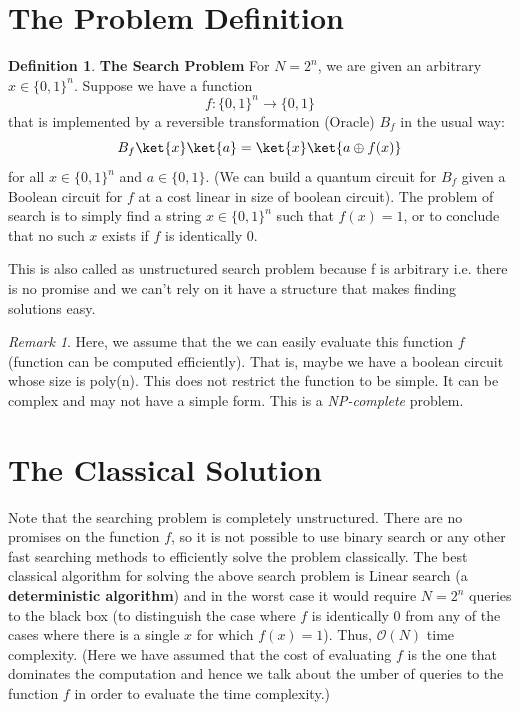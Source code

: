 \documentclass[12pt, oneside]{book}
\theoremstyle{definition}
\newtheorem{definition}{Definition}[section]
\theoremstyle{definition}
\theoremstyle{remark}
\newtheorem*{remark}{Remark}
\begin{document}
\section{The Problem Definition}
\begin{definition}
    \textbf{The Search Problem} For $N = 2^n$, we are given an arbitrary $x \in \{0, 1\}^n$.
    Suppose we have a function
    \[
        f:\{0,1\}^n \rightarrow \{0,1\}
    \]
    that is implemented by a reversible transformation (Oracle) $B_f$ in the usual way:
    \[
        B_f\ket{x}\ket{a}=\ket{x}\ket{a\oplus f(x)}
    \]
    for all $x \in \{0,1\}^n$ and $a \in \{0,1\}$. (We can build a quantum circuit for $B_f$ given a Boolean circuit for $f$ at a cost linear in size of boolean circuit). The problem of search is to simply find a string 
    $ x \in \{0,1\}^n$ such that $f(x)=1$, or to conclude that no such $x$ exists if $f$ is identically 0. 

    This is also called as unstructured search problem because f is arbitrary i.e. there is no promise and we can't rely on it have a structure that makes finding solutions easy.
    \begin{remark}Here, we assume that the we can easily evaluate this function $f$ (function can be computed efficiently). That is, maybe we have a boolean circuit whose size is poly(n). This does not restrict the function to be simple. It can be complex and may not have a simple form. This is a \textit{NP-complete} problem. 
    \end{remark}
\end{definition}

\section{The Classical Solution}
Note that the searching problem is completely unstructured. There are no promises on the function $f$, so it is not possible to use binary search or any 
other fast searching methods to efficiently solve the problem classically. The best classical algorithm for solving the above search problem is Linear search (a \textbf{deterministic algorithm}) and in the worst case it would require $N=2^n$ queries to the black box (to distinguish the case where $f$ is identically 0 from any of the cases where there is a single $x$ for which $f(x)=1$). Thus, $\mathcal{O}(N)$ time complexity. (Here we have assumed that the cost of evaluating $f$ is the one that dominates the computation and hence we talk about the umber of queries to the function $f$ in order to evaluate the time complexity.)
\end{document}
